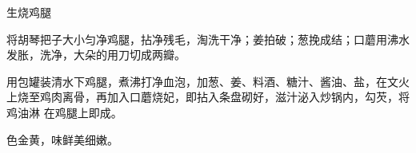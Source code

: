 %
%
%
%
%
%
%
\begin{recipe}{生烧鸡腿}

\ingredients


\preparation

\step 将胡琴把子大小匀净鸡腿，拈净残毛，淘洗干净；姜拍破；葱挽成结；口蘑用沸水
发胀，洗净，大朵的用刀切成两瓣。

\step 用包罐装清水下鸡腿，煮沸打净血泡，加葱、姜、料酒、糖汁、酱油、盐，在文火
上烧至鸡肉离骨，再加入口蘑烧妃，即拈入条盘砌好，滋汁泌入炒锅内，勾芡，将鸡油淋
在鸡腿上即成。

\features

色金黄，味鲜美细嫩。

\end{recipe}

